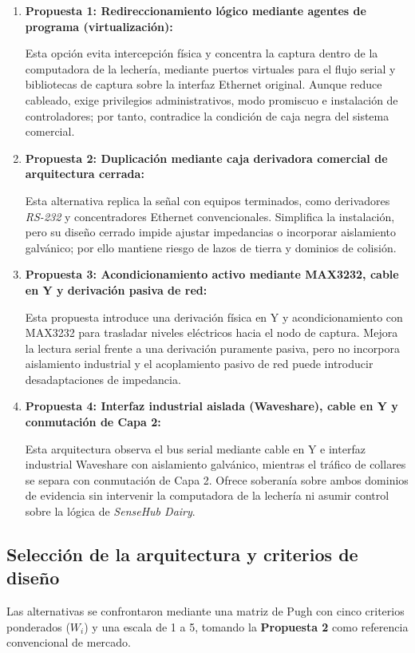 \begin{enumerate}
    \item \textbf{Propuesta 1: Redireccionamiento lógico mediante agentes de programa (virtualización):}

    Esta opción evita intercepción física y concentra la captura dentro de la computadora de la lechería, mediante puertos virtuales para el flujo serial y bibliotecas de captura sobre la interfaz Ethernet original. Aunque reduce cableado, exige privilegios administrativos, modo promiscuo e instalación de controladores; por tanto, contradice la condición de caja negra del sistema comercial.

    \item \textbf{Propuesta 2: Duplicación mediante caja derivadora comercial de arquitectura cerrada:}

    Esta alternativa replica la señal con equipos terminados, como derivadores \textit{RS-232} y concentradores Ethernet convencionales. Simplifica la instalación, pero su diseño cerrado impide ajustar impedancias o incorporar aislamiento galvánico; por ello mantiene riesgo de lazos de tierra y dominios de colisión.

    \item \textbf{Propuesta 3: Acondicionamiento activo mediante MAX3232, cable en Y y derivación pasiva de red:}

    Esta propuesta introduce una derivación física en Y y acondicionamiento con MAX3232 para trasladar niveles eléctricos hacia el nodo de captura. Mejora la lectura serial frente a una derivación puramente pasiva, pero no incorpora aislamiento industrial y el acoplamiento pasivo de red puede introducir desadaptaciones de impedancia.

    \item \textbf{Propuesta 4: Interfaz industrial aislada (Waveshare), cable en Y y conmutación de Capa 2:}

    Esta arquitectura observa el bus serial mediante cable en Y e interfaz industrial Waveshare con aislamiento galvánico, mientras el tráfico de collares se separa con conmutación de Capa 2. Ofrece soberanía sobre ambos dominios de evidencia sin intervenir la computadora de la lechería ni asumir control sobre la lógica de \textit{SenseHub Dairy}.
\end{enumerate}

\subsection{Selección de la arquitectura y criterios de diseño}
Las alternativas se confrontaron mediante una matriz de Pugh con cinco criterios ponderados ($W_i$) y una escala de 1 a 5, tomando la \textbf{Propuesta 2} como referencia convencional de mercado.

